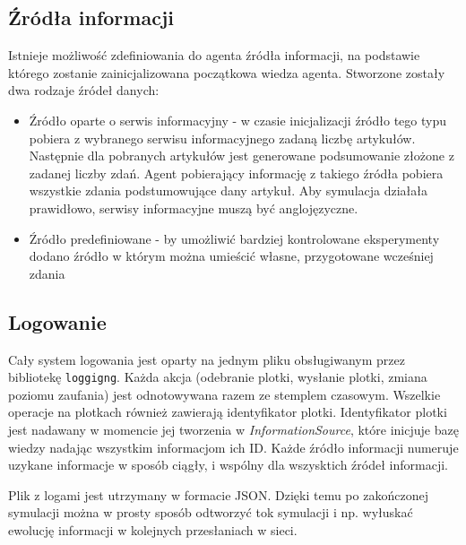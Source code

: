 \documentclass{article}
\begin{document}
	\subsection{Źródła informacji}
	Istnieje możliwość zdefiniowania do agenta źródła informacji, na podstawie którego zostanie zainicjalizowana początkowa wiedza agenta. Stworzone zostały dwa rodzaje źródeł danych:
	\begin{itemize}
		\item{Źródło oparte o serwis informacyjny - w czasie inicjalizacji źródło tego typu pobiera z wybranego serwisu informacyjnego zadaną liczbę artykułów. Następnie dla pobranych artykułów jest generowane podsumowanie złożone z zadanej liczby zdań. Agent pobierający informację z takiego źródła pobiera wszystkie zdania podstumowujące dany artykuł. Aby symulacja działała prawidłowo, serwisy informacyjne muszą być anglojęzyczne.}
		\item{Źródło predefiniowane - by umożliwić bardziej kontrolowane eksperymenty dodano źródło w którym można umieścić własne, przygotowane wcześniej zdania} 
	\end{itemize}
	\subsection{Logowanie}
	Cały system logowania jest oparty na jednym pliku obsługiwanym przez bibliotekę \texttt{loggigng}. Każda akcja (odebranie plotki, wysłanie plotki, zmiana poziomu zaufania) jest odnotowywana razem ze stemplem czasowym. Wszelkie operacje na plotkach również zawierają identyfikator plotki. Identyfikator plotki jest nadawany w momencie jej tworzenia w \textit{InformationSource}, które inicjuje bazę wiedzy nadając wszystkim informacjom ich ID. Każde źródło informacji numeruje uzykane informacje w sposób ciągły, i wspólny dla wszysktich źródeł informacji.

	Plik z logami jest utrzymany w formacie JSON. Dzięki temu po zakończonej symulacji można w prosty sposób odtworzyć tok symulacji i np. wyłuskać ewolucję informacji w kolejnych przesłaniach w sieci.
\end{document}
